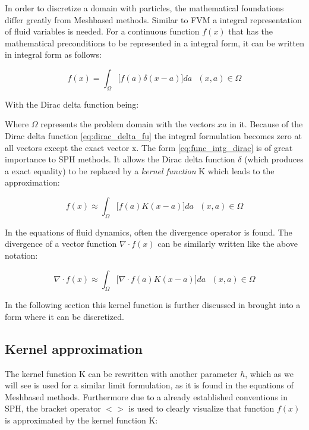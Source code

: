 In order to discretize a domain with particles, the mathematical foundations differ greatly from Meshbased methods. Similar to FVM a integral representation of fluid variables is needed. For a continuous function $f(x)$ that has the mathematical preconditions to be represented in a integral form, it can be written in integral form as follows:

\begin{equation} \label{eq:func_intg_dirac}
f(x) = \int_{\Omega} \biggl [ f(a) \delta(x-a) \biggr ] d a \ \ \ (x, a) \in \Omega
\end{equation}

With the Dirac delta function being:



Where $ \Omega $ represents the problem domain with the vectors $ x  a $ in it. Because of the Dirac delta function \ref{eq:dirac_delta_fu} the integral formulation becomes zero at all vectors except the exact vector x. The form \ref{eq:func_intg_dirac} is of great importance to SPH methods. It allows the Dirac delta function $\delta$ (which produces a exact equality)  to be replaced by a \emph{kernel function} K which leads to the approximation:

\begin{equation} \label{eq:func_intg_kernel}
f(x) \approx \int_{\Omega} \biggl [ f(a) K(x-a) \biggr ] d a \ \ \ (x, a) \in \Omega
\end{equation}

In the equations of fluid dynamics, often the divergence operator is found. The divergence of a vector function $\nabla \cdot f(x)$ can be similarly
written like the above notation:

\begin{equation} \label{eq:func_intg_kernel_div}
\nabla \cdot f(x) \approx \int_{\Omega} \biggl [ \nabla \cdot f(a) K(x-a) \biggr ] d a \ \ \ (x, a) \in \Omega
\end{equation}
 

In the following section this kernel function is further discussed in brought into a form where it can be discretized.

\subsection{Kernel approximation}
The kernel function K can be rewritten with another parameter $h$, which as we will see is used for a similar limit formulation, as it is found in the equations of Meshbased methods. Furthermore due to a already established conventions in SPH, the bracket operator $ < >$ is used to 
clearly visualize that function $f(x)$ is approximated by the kernel function K:

